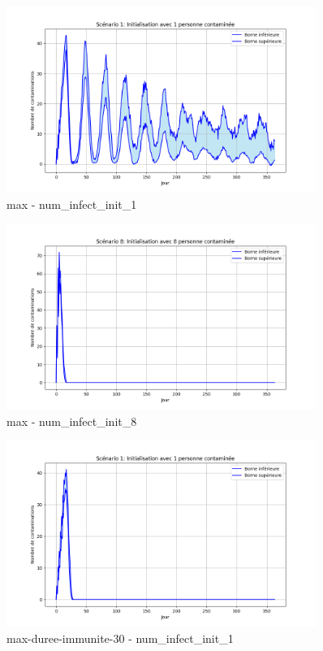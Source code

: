 \documentclass[12pt,french,titlepage]{article}
\begin{document}
\begin{figure}[H]
    \centering
    \includegraphics[width=0.9\textwidth]{graphiques/max/num_infect_init_1.png}
    \caption{max - num\_infect\_init\_1}
    \label{fig:max-num_infect_init_1}
\end{figure}

\begin{figure}[H]
    \centering
    \includegraphics[width=0.9\textwidth]{graphiques/max/num_infect_init_8.png}
    \caption{max - num\_infect\_init\_8}
    \label{fig:max-num_infect_init_8}
\end{figure}

\begin{figure}[H]
    \centering
    \includegraphics[width=0.9\textwidth]{graphiques/max-duree-immunite-30/num_infect_init_1.png}
    \caption{max-duree-immunite-30 - num\_infect\_init\_1}
    \label{fig:max-duree-immunite-30-num_infect_init_1}
\end{figure}
\end{document}
